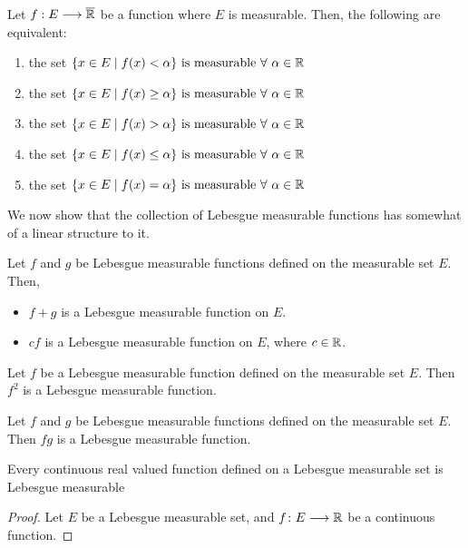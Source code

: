 \documentclass[a4paper]{book}
\begin{document}
\begin{theorem}
Let $f:E\longrightarrow\overline{\mathbb{R}}$ be a function where $E$ is measurable. Then, the following are equivalent: 
\begin{enumerate}
\item the set $\qty{x\in E \mid f(x)<\alpha} \text{ is measurable}\ \forall\ \alpha\in \mathbb{R}$
\item the set $\qty{x\in E \mid f(x)\geq\alpha} \text{ is measurable}\ \forall\ \alpha\in \mathbb{R}$
\item the set $\qty{x\in E \mid f(x)>\alpha} \text{ is measurable}\ \forall\ \alpha\in \mathbb{R}$
\item the set $\qty{x\in E \mid f(x)\leq\alpha} \text{ is measurable}\ \forall\ \alpha\in \mathbb{R}$
\item the set $\qty{x\in E \mid f(x)=\alpha} \text{ is measurable}\ \forall\ \alpha\in \mathbb{R}$
\end{enumerate}
\end{theorem}
We now show that the collection of Lebesgue measurable functions has somewhat of a linear structure to it.
\begin{theorem}
Let $f$ and $g$ be Lebesgue measurable functions defined on the measurable set $E$. Then, 
\begin{itemize}
\item $f+g$ is a Lebesgue measurable function on $E$.
\item $cf$ is a Lebesgue measurable function on $E$, where $c \in \mathbb{R}$.
\end{itemize}
\end{theorem}
\begin{lemma}
Let $f$ be a Lebesgue measurable function defined on the measurable set $E$. Then $f^2$ is a Lebesgue measurable function.
\end{lemma}
\begin{theorem}
Let $f$ and $g$ be Lebesgue measurable functions defined on the measurable set $E$. Then $fg$ is a Lebesgue measurable function.
\end{theorem}
\begin{theorem}
Every continuous real valued function defined on a Lebesgue measurable set is Lebesgue measurable
\begin{proof}
Let $E$ be a Lebesgue measurable set, and $f\colon E \longrightarrow \mathbb{R}$ be a continuous function. 
\end{proof}
\end{theorem}
\end{document}
